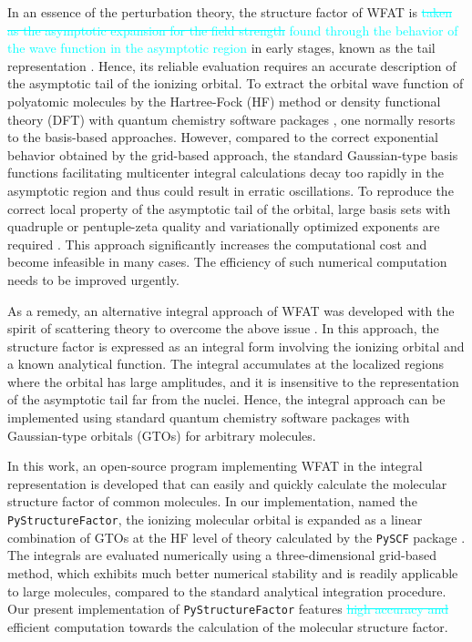 \documentclass[preprint,12pt]{elsarticle} %
\newcommand{\cyan}[1]{\textcolor{cyan}{#1}}     %
\newcommand{\cout}[1]{\textcolor{cyan}{\sout{#1}}}
\begin{document}
In an essence of the perturbation theory, the structure factor of WFAT is \cout{taken as the asymptotic expansion for the field strength} \cyan{found through the behavior of the wave function in the asymptotic region} in early stages, known as the tail representation \cite{madsen_structure_2013, trinh_weak-field_2015, madsen_application_2014}. Hence, its reliable evaluation requires an accurate description of the asymptotic tail of the ionizing orbital. To extract the orbital wave function of polyatomic molecules by the Hartree-Fock (HF) method or density functional theory (DFT) with quantum chemistry software packages \cite{madsen_application_2014, saito_structure_2015}, one normally resorts to the basis-based approaches. However, compared to the correct exponential behavior obtained by the grid-based approach, the standard Gaussian-type basis functions facilitating multicenter integral calculations decay too rapidly in the asymptotic region and thus could result in erratic oscillations. To reproduce the correct local property of the asymptotic tail of the orbital, large basis sets with quadruple or pentuple-zeta quality and variationally optimized exponents are required \cite{trinh_first-order_2013}. This approach significantly increases the computational cost and become infeasible in many cases. The efficiency of such numerical computation needs to be improved urgently.

As a remedy, an alternative integral approach of WFAT was developed with the spirit of scattering theory to overcome the above issue \cite{madsen_structure_2017, dnestryan_structure_2018, samygin_weak-field_2018}. In this approach, the structure factor is expressed as an integral form involving the ionizing orbital and a known analytical function. The integral accumulates at the localized regions where the orbital has large amplitudes, and it is insensitive to the representation of the asymptotic tail far from the nuclei. Hence, the integral approach can be implemented using standard quantum chemistry software packages with Gaussian-type orbitals (GTOs) for arbitrary molecules.

In this work, an open-source program implementing WFAT in the integral representation is developed that can easily and quickly calculate the molecular structure factor of common molecules. In our implementation, named the \texttt{PyStructureFactor}, the ionizing molecular orbital is expanded as a linear combination of GTOs at the HF level of theory calculated by the \texttt{PySCF} package \cite{sun_pyscf_2018, sun_recent_2020}. The integrals are evaluated numerically using a three-dimensional grid-based method, which exhibits much better numerical stability and is readily applicable to large molecules, compared to the standard analytical integration procedure. Our present implementation of \texttt{PyStructureFactor} features \cout{high accuracy and} efficient computation towards the calculation of the molecular structure factor.
\end{document}
